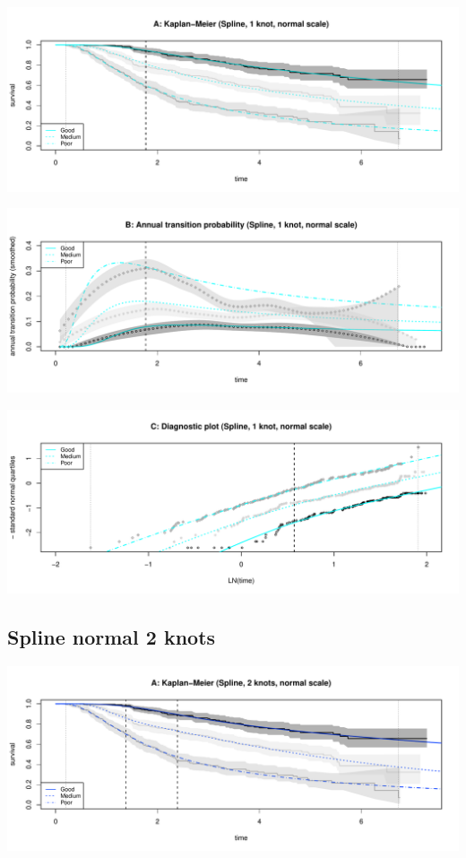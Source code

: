 \documentclass[]{article}
\begin{document}
\begin{flushleft}\includegraphics[height=0.3\textheight]{images/spline_norm1-1} \end{flushleft}

\begin{flushleft}\includegraphics[height=0.3\textheight]{images/spline_norm1-2} \end{flushleft}

\begin{flushleft}\includegraphics[height=0.3\textheight]{images/spline_norm1-3} \end{flushleft}

\subsection{Spline normal 2 knots}\label{spline-normal-2-knots}

\begin{flushleft}\includegraphics[height=0.3\textheight]{images/spline_norm2-1} \end{flushleft}
\end{document}
